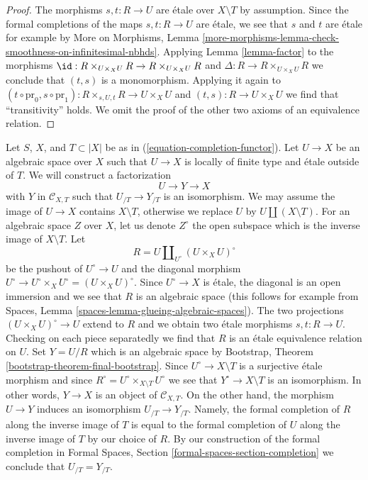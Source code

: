 \begin{proof}
The morphisms $s, t : R \to U$ are \'etale over $X \setminus T$
by assumption. Since the formal completions of the maps
$s, t : R \to U$ are \'etale, we see that $s$ and $t$ are \'etale
for example by More on Morphisms, Lemma
\ref{more-morphisms-lemma-check-smoothness-on-infinitesimal-nbhds}.
Applying Lemma \ref{lemma-factor} to the morphisms
$\id : R \times_{U \times_X U} R \to R \times_{U \times_X U} R$
and $\Delta : R \to R \times_{U \times_X U} R$ we conclude that
$(t, s)$ is a monomorphism. Applying it again to
$(t \circ \text{pr}_0, s \circ \text{pr}_1) :
R \times_{s, U, t} R \to U \times_X U$ and $(t, s) : R \to U \times_X U$
we find that ``transitivity'' holds. We omit the proof of
the other two axioms of an equivalence relation.
\end{proof}

\begin{remark}
\label{remark-smash-away-from-T}
Let $S$, $X$, and $T \subset |X|$ be as in (\ref{equation-completion-functor}).
Let $U \to X$ be an algebraic space over $X$ such that $U \to X$ is
locally of finite type and \'etale outside of $T$. We will construct a
factorization
$$
U \longrightarrow Y \longrightarrow X
$$
with $Y$ in $\mathcal{C}_{X, T}$ such that $U_{/T} \to Y_{/T}$ is an
isomorphism. We may assume the image of $U \to X$ contains
$X \setminus T$, otherwise we replace $U$ by $U \amalg (X \setminus T)$.
For an algebraic space $Z$ over $X$, let us denote $Z^\circ$
the open subspace which is the inverse image of $X \setminus T$.
Let
$$
R = U \amalg_{U^\circ} (U \times_X U)^\circ
$$
be the pushout of $U^\circ \to U$ and the diagonal morphism
$U^\circ \to U^\circ \times_X U^\circ = (U \times_X U)^\circ$.
Since $U^\circ \to X$ is \'etale, the diagonal is an open immersion
and we see that $R$ is an algebraic space (this follows for example
from Spaces, Lemma \ref{spaces-lemma-glueing-algebraic-spaces}).
The two projections $(U \times_X U)^\circ \to U$ extend to $R$
and we obtain two \'etale morphisms $s, t : R \to U$. Checking on each
piece separatedly we find that $R$ is an \'etale equivalence
relation on $U$. Set $Y = U/R$ which is an algebraic space by
Bootstrap, Theorem \ref{bootstrap-theorem-final-bootstrap}.
Since $U^\circ \to X \setminus T$ is a surjective \'etale morphism
and since $R^\circ = U^\circ \times_{X \setminus T} U^\circ$
we see that $Y^\circ \to X \setminus T$ is an isomorphism.
In other words, $Y \to X$ is an object of $\mathcal{C}_{X, T}$.
On the other hand, the morphism $U \to Y$ induces an isomorphism
$U_{/T} \to Y_{/T}$. Namely, the formal completion of $R$
along the inverse image of $T$ is equal to the formal completion of
$U$ along the inverse image of $T$ by our choice of $R$. By
our construction of the formal completion in
Formal Spaces, Section \ref{formal-spaces-section-completion}
we conclude that $U_{/T} = Y_{/T}$.
\end{remark}

